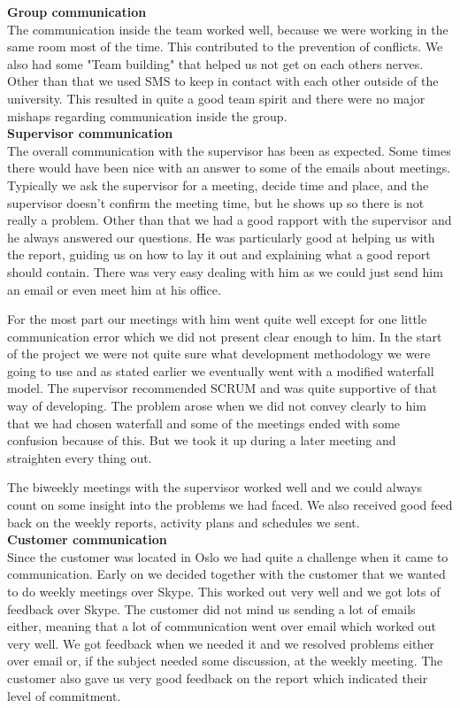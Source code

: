 
\indent \indent \textbf{Group communication} \\
The communication inside the team worked well, because we were working in the same room most of the time. This contributed to the prevention of conflicts. We also had some "Team building" that helped us not get on each others nerves. Other than that we used SMS to keep in contact with each other outside of the university. This resulted in quite a good team spirit and there were no major mishaps regarding communication inside the group.
\\

\textbf{Supervisor communication} \\
The overall communication with the supervisor has been as expected. Some times there would have been nice with an answer to some of the emails about meetings. Typically we ask the supervisor for a meeting, decide time and place, and the supervisor doesn't confirm the meeting time, but he shows up so there is not really a problem. Other than that we had a good rapport with the supervisor and he always answered our questions. He was particularly good at helping us with the report, guiding us on how to lay it out and explaining what a good report should contain. There was very easy dealing with him as we could just send him an email or even meet him at his office.

For the most part our meetings with him went quite well except for one little communication error which we did not present clear enough to him. In the start of the project we were not quite sure what development methodology we were going to use and as stated earlier we eventually went with a modified waterfall model. The supervisor recommended SCRUM and was quite supportive of that way of developing. The problem arose when we did not convey clearly to him that we had chosen waterfall and some of the meetings ended with some confusion because of this. But we took it up during a later meeting and straighten every thing out.

The biweekly meetings with the supervisor worked well and we could always count on some insight into the problems we had faced. We also received good feed back on the weekly reports, activity plans and schedules we sent.
\\ 

\textbf{Customer communication} \\
Since the customer was located in Oslo we had quite a challenge when it came to communication. Early on we decided together with the customer that we wanted to do weekly meetings over Skype. This worked out very well and we got lots of feedback over Skype. The customer did not mind us sending a lot of emails either, meaning that a lot of communication went over email which worked out very well. We got feedback when we needed it and we resolved problems either over email or, if the subject needed some discussion, at the weekly meeting. The customer also gave us very good feedback on the report which indicated their level of commitment. 

